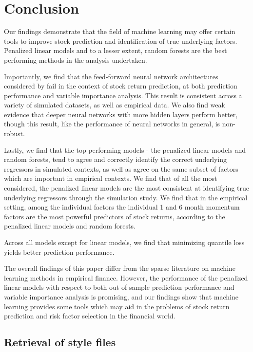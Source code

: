 \documentclass{article}
\begin{document}
\section{Conclusion}

Our findings demonstrate that the field of machine learning may offer certain tools to improve stock prediction and identification of true underlying factors. Penalized linear models and to a lesser extent, random forests are the best performing methods in the analysis undertaken.

Importantly, we find that the feed-forward neural network architectures considered by \cite{gu_empirical_2018} fail in the context of stock return prediction, at both prediction performance and variable importance analysis. This result is consistent across a variety of simulated datasets, as well as empirical data. We also find weak evidence that deeper neural networks with more hidden layers perform better, though this result, like the performance of neural networks in general, is non-robust.

Lastly, we find that the top performing models - the penalized linear models and random forests, tend to agree and correctly identify the correct underlying regressors in simulated contexts, as well as agree on the same subset of factors which are important in empirical contexts. We find that of all the most considered, the penalized linear models are the most consistent at identifying true underlying regressors through the simulation study. We find that in the empirical setting, among the individual factors the individual 1 and 6 month momentum factors are the most powerful predictors of stock returns, according to the penalized linear models and random forests. 

Across all models except for linear models, we find that minimizing quantile loss yields better prediction performance.

The overall findings of this paper differ from the sparse literature on machine learning methods in empirical finance. However, the performance of the penalized linear models with respect to both out of sample prediction performance and variable importance analysis is promising, and our findings show that machine learning provides some tools which may aid in the problems of stock return prediction and risk factor selection in the financial world. 

\subsection{Retrieval of style files}
\end{document}
